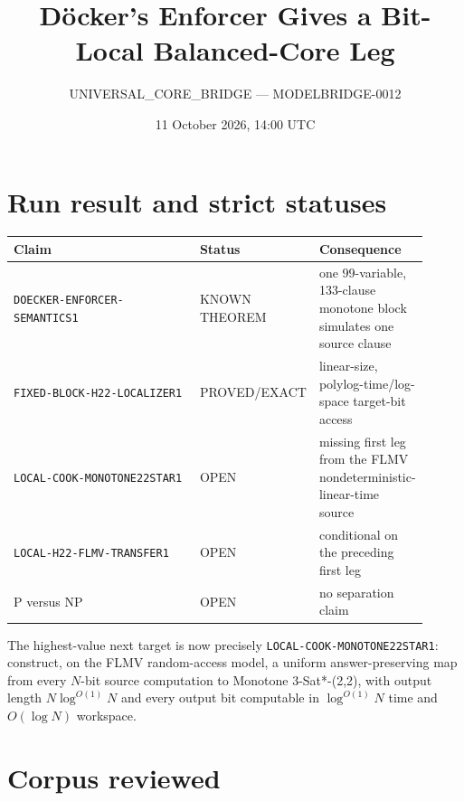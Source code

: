 \documentclass[11pt]{article}
\title{D\"ocker's Enforcer Gives a Bit-Local Balanced-Core Leg}
\author{UNIVERSAL\_CORE\_BRIDGE --- MODELBRIDGE-0012}
\date{11 October 2026, 14:00 UTC}
\begin{document}
\maketitle

\begin{center}
\end{center}

\section*{Run result and strict statuses}

\begin{center}
\begin{tabular}{@{}p{0.48\linewidth}p{0.20\linewidth}p{0.23\linewidth}@{}}
\toprule
Claim & Status & Consequence\\
\midrule
\texttt{DOECKER-ENFORCER-SEMANTICS1} & KNOWN THEOREM & one 99-variable,
133-clause monotone block simulates one source clause\\
\texttt{FIXED-BLOCK-H22-LOCALIZER1} & PROVED/EXACT & linear-size,
polylog-time/log-space target-bit access\\
\texttt{LOCAL-COOK-MONOTONE22STAR1} & OPEN & missing first leg from the
FLMV nondeterministic-linear-time source\\
\texttt{LOCAL-H22-FLMV-TRANSFER1} & OPEN & conditional on the preceding
first leg\\
P versus NP & OPEN & no separation claim\\
\bottomrule
\end{tabular}
\end{center}

The highest-value next target is now precisely
\texttt{LOCAL-COOK-MONOTONE22STAR1}: construct, on the FLMV random-access
model, a uniform answer-preserving map from every $N$-bit source computation
to Monotone 3-Sat*-(2,2), with output length $N\log^{O(1)}N$ and every output
bit computable in $\log^{O(1)}N$ time and $O(\log N)$ workspace.

\section{Corpus reviewed}
\end{document}
